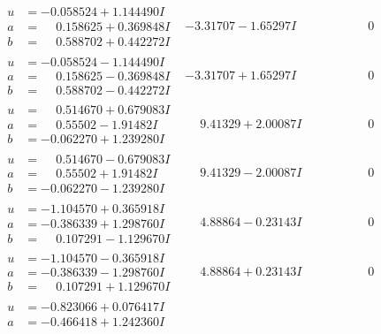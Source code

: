 \documentclass[1p]{elsarticle_modified}
\theoremstyle{definition}
\begin{document}
$$\begin{array}{c|c|c}
 \hline 
\begin{aligned}
u &= -0.058524 + 1.144490 I \\
a &= \phantom{-}0.158625 + 0.369848 I \\
b &= \phantom{-}0.588702 + 0.442272 I\end{aligned}
 & -3.31707 - 1.65297 I & \phantom{-0.000000 } 0 \\ \hline\begin{aligned}
u &= -0.058524 - 1.144490 I \\
a &= \phantom{-}0.158625 - 0.369848 I \\
b &= \phantom{-}0.588702 - 0.442272 I\end{aligned}
 & -3.31707 + 1.65297 I & \phantom{-0.000000 } 0 \\ \hline\begin{aligned}
u &= \phantom{-}0.514670 + 0.679083 I \\
a &= \phantom{-}0.55502 - 1.91482 I \\
b &= -0.062270 + 1.239280 I\end{aligned}
 & \phantom{-}9.41329 + 2.00087 I & \phantom{-0.000000 } 0 \\ \hline\begin{aligned}
u &= \phantom{-}0.514670 - 0.679083 I \\
a &= \phantom{-}0.55502 + 1.91482 I \\
b &= -0.062270 - 1.239280 I\end{aligned}
 & \phantom{-}9.41329 - 2.00087 I & \phantom{-0.000000 } 0 \\ \hline\begin{aligned}
u &= -1.104570 + 0.365918 I \\
a &= -0.386339 + 1.298760 I \\
b &= \phantom{-}0.107291 - 1.129670 I\end{aligned}
 & \phantom{-}4.88864 - 0.23143 I & \phantom{-0.000000 } 0 \\ \hline\begin{aligned}
u &= -1.104570 - 0.365918 I \\
a &= -0.386339 - 1.298760 I \\
b &= \phantom{-}0.107291 + 1.129670 I\end{aligned}
 & \phantom{-}4.88864 + 0.23143 I & \phantom{-0.000000 } 0 \\ \hline\begin{aligned}
u &= -0.823066 + 0.076417 I \\
a &= -0.466418 + 1.242360 I \\

\end{aligned}
\end{array}$$
\end{document}
